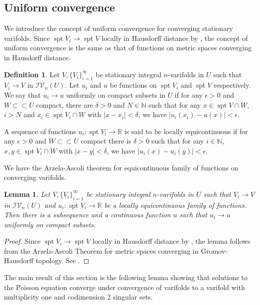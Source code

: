 \documentclass[11pt]{amsart}
\newtheorem{lemma}[theorem]{Lemma}
\theoremstyle{definition}
\newtheorem{definition}[theorem]{Definition}
\newcommand{\R}{\mathbb{R}}
\newcommand{\N}{\mathbb{N}}
\newcommand{\IV}{\mathcal{IV}}
\newcommand{\ssubset}{\subset\subset}
\DeclareMathOperator{\spt}{spt}
\begin{document}
\subsection{Uniform convergence}
We introduce the concept of uniform convergence for converging stationary varifolds. Since $\spt V_i\to\spt V$ locally in Hausdorff distance by \cite[Chapter 4 Theorem 7.4]{simon2014introduction}, the concept of uniform convergence is the same as that of functions on metric spaces converging in Hausdorff distance.
\begin{definition}
	Let $V,\{V_i\}_{i=1}^\infty$ be stationary integral $n$-varifolds in $U$ such that $V_i\to V$ in $\IV_n(U)$. Let $u_i$ and $u$ be functions on $\spt V_i$ and $\spt V$ respectively. We say that $u_i\to u$ uniformly on compact subsets in $U$ if for any $\epsilon>0$ and $W\ssubset U$ compact, there are $\delta>0$ and $N\in\N$ such that for any $x\in \spt V\cap W$, $i>N$ and $x_i\in \spt V_i\cap W$ with $|x-x_i|<\delta$, we have $|u_i(x_i)- u(x)|<\epsilon$.
	
	
	A sequence of functions $u_i:\spt V_i\to \R$ is said to be locally equicontinuous if for any $\epsilon>0$ and $W\ssubset U$ compact there is $\delta>0$ such that for any $i\in\N$, $x,y\in \spt V_i\cap W$ with $|x-y|<\delta$, we have $|u_i(x)-u_i(y)|< \epsilon$.
\end{definition}
We have the Arzela-Ascoli theorem for equicontinuous family of functions on converging varifolds.
\begin{lemma}\label{arzela.ascoli}
	Let $V,\{V_i\}_{i=1}^\infty$ be stationary integral $n$-varifolds in $U$ such that $V_i\to V$ in $\IV_n(U)$ and $u_i:\spt V_i\to \R$ be a locally equicontinuous family of functions. Then there is a subsequence and a continuous function $u$ such that $u_i\to u$ uniformly on compact subsets.
\end{lemma}
\begin{proof}
	 Since $\spt V_i\to\spt V$ locally in Hausdorff distance by \cite[Chapter 4 Theorem 7.4]{simon2014introduction}, the lemma follows from the Arzela-Ascoli Theorem for metric spaces converging in Gromov-Hausdorff topology. See \cite[Lemma 45]{petersen2006riemannian}.
\end{proof}
The main result of this section is the following lemma showing that solutions to the Poisson equation converge under convergence of varifolds to a varifold with multiplicity one and codimension 2 singular sets.
\end{document}
